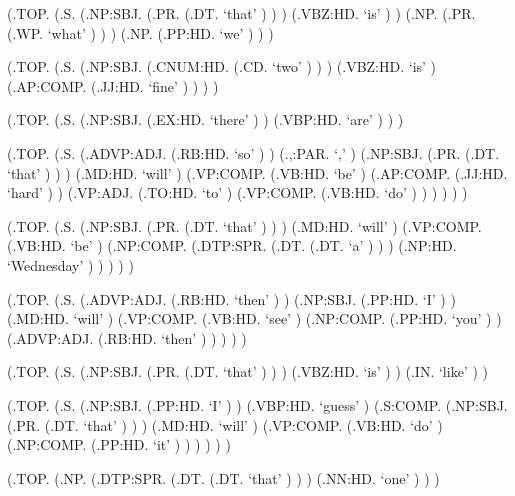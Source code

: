 \documentclass[10pt]{article}
\begin{document}
\begin{parsetree}  (.TOP. (.S. (.NP:SBJ. (.PR. (.DT. `that' ) ) ) (.VBZ:HD. `is' ) ) (.NP. (.PR. (.WP. `what' ) ) ) (.NP. (.PP:HD. `we' ) ) ) \end{parsetree}

\begin{parsetree}  (.TOP. (.S. (.NP:SBJ. (.CNUM:HD. (.CD. `two' ) ) ) (.VBZ:HD. `is' ) (.AP:COMP. (.JJ:HD. `fine' ) ) ) ) \end{parsetree}

\begin{parsetree}  (.TOP. (.S. (.NP:SBJ. (.EX:HD. `there' ) ) (.VBP:HD. `are' ) ) ) \end{parsetree}

\begin{parsetree}  (.TOP. (.S. (.ADVP:ADJ. (.RB:HD. `so' ) ) (.,:PAR. `,' ) (.NP:SBJ. (.PR. (.DT. `that' ) ) ) (.MD:HD. `will' ) (.VP:COMP. (.VB:HD. `be' ) (.AP:COMP. (.JJ:HD. `hard' ) ) (.VP:ADJ. (.TO:HD. `to' ) (.VP:COMP. (.VB:HD. `do' ) ) ) ) ) ) \end{parsetree}

\begin{parsetree}  (.TOP. (.S. (.NP:SBJ. (.PR. (.DT. `that' ) ) ) (.MD:HD. `will' ) (.VP:COMP. (.VB:HD. `be' ) (.NP:COMP. (.DTP:SPR. (.DT. (.DT. `a' ) ) ) (.NP:HD. `Wednesday' ) ) ) ) ) \end{parsetree}

\begin{parsetree}  (.TOP. (.S. (.ADVP:ADJ. (.RB:HD. `then' ) ) (.NP:SBJ. (.PP:HD. `I' ) ) (.MD:HD. `will' ) (.VP:COMP. (.VB:HD. `see' ) (.NP:COMP. (.PP:HD. `you' ) ) (.ADVP:ADJ. (.RB:HD. `then' ) ) ) ) ) \end{parsetree}

\begin{parsetree}  (.TOP. (.S. (.NP:SBJ. (.PR. (.DT. `that' ) ) ) (.VBZ:HD. `is' ) ) (.IN. `like' ) ) \end{parsetree}

\begin{parsetree}  (.TOP. (.S. (.NP:SBJ. (.PP:HD. `I' ) ) (.VBP:HD. `guess' ) (.S:COMP. (.NP:SBJ. (.PR. (.DT. `that' ) ) ) (.MD:HD. `will' ) (.VP:COMP. (.VB:HD. `do' ) (.NP:COMP. (.PP:HD. `it' ) ) ) ) ) ) \end{parsetree}

\begin{parsetree}  (.TOP. (.NP. (.DTP:SPR. (.DT. (.DT. `that' ) ) ) (.NN:HD. `one' ) ) ) \end{parsetree}
\end{document}
